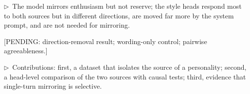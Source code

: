 \documentclass[11pt]{article}
\newcommand{\flow}[1]{\par\noindent\textcolor{blue!60!black}{\small$\triangleright$\ #1}\par\medskip}
\newcommand{\pending}[1]{\par\noindent\textcolor{orange!80!black}{\small[PENDING: #1]}\par\medskip}
\begin{document}
\flow{The model mirrors enthusiasm but not reserve; the style heads respond most to both sources but in different directions, are moved far more by the system prompt, and are not needed for mirroring.}
\pending{direction-removal result; wording-only control; pairwise agreeableness.}

\flow{Contributions: first, a dataset that isolates the source of a personality; second, a head-level comparison of the two sources with causal tests; third, evidence that single-turn mirroring is selective.}
\end{document}
